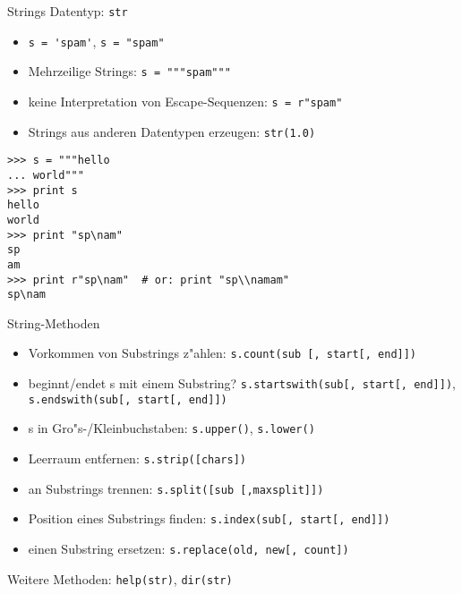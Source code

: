 \begin{frame}[fragile]{Strings}
Datentyp: \alert{\lstinline{str}}
\begin{itemize}
\item \lstinline{s = 'spam'}, \lstinline{s = "spam"}
\item Mehrzeilige Strings: \lstinline{s = """spam"""}
\item keine Interpretation von Escape-Sequenzen: \lstinline{s = r"spam"}
\item Strings aus anderen Datentypen erzeugen: \lstinline{str(1.0)}
\end{itemize}
\begin{lstlisting}[style=Shell]
>>> s = """hello
... world"""
>>> print s
hello
world
>>> print "sp\nam"
sp
am
>>> print r"sp\nam"  # or: print "sp\\namam"
sp\nam
\end{lstlisting}
\end{frame}

\begin{frame}{String-Methoden}
\begin{itemize}
\item Vorkommen von Substrings z"ahlen: \lstinline{s.count(sub [, start[, end]])}
\item beginnt/endet s mit einem Substring? \lstinline{s.startswith(sub[, start[, end]])}, \lstinline{s.endswith(sub[, start[, end]])}
\item s in Gro"s-/Kleinbuchstaben: \lstinline{s.upper()}, \lstinline{s.lower()}
\item Leerraum entfernen: \lstinline{s.strip([chars])}
\item an Substrings trennen: \lstinline{s.split([sub [,maxsplit]])}
\item Position eines Substrings finden: \lstinline{s.index(sub[, start[, end]])}
\item einen Substring ersetzen: \lstinline{s.replace(old, new[, count])}
\end{itemize}
Weitere Methoden: \lstinline{help(str)}, \lstinline{dir(str)}
\end{frame}

